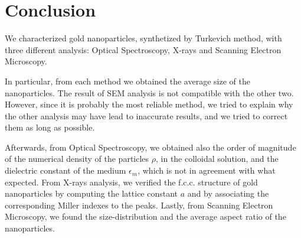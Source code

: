 \documentclass[prb,twocolumn]{revtex4-1}
\begin{document}
\section{Conclusion}
We characterized gold nanoparticles, synthetized by Turkevich method, with three different analysis: Optical Spectroscopy, X-rays and Scanning Electron Microscopy. 

In particular, from each method we obtained the average size of the nanoparticles. 
The result of SEM analysis is not compatible with the other two. However, since it is probably the most reliable method, we tried to explain why the other analysis may have lead to inaccurate results, and we tried to correct them as long as possible. 

Afterwards, from Optical Spectroscopy, we obtained also the order of magnitude of the numerical density of the particles $\rho$, in the colloidal solution,  and the dielectric constant of the medium $\epsilon_m$, which is not in agreement with what expected. 
From X-rays analysis, we verified the f.c.c. structure of gold nanoparticles by computing the lattice constant $a$ and by associating the corresponding Miller indexes to the peaks. 
Lastly, from Scanning Electron Microscopy, we found the size-distribution and the average aspect ratio of the nanoparticles.


\printbibliography

\vskip 0.4cm
\end{document}
